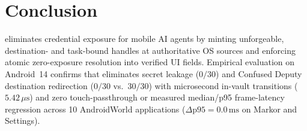 \section{Conclusion}
\label{sec:conclusion}

\SH{} eliminates credential exposure for mobile AI agents by minting unforgeable, destination- and task-bound handles at authoritative OS sources and enforcing atomic zero-exposure resolution into verified UI fields. Empirical evaluation on Android~14 confirms that \SH{} eliminates secret leakage ($0/30$) and Confused Deputy destination redirection ($0/30$ vs.\ $30/30$) with microsecond in-vault transitions ($5.42\,\mu\text{s}$) and zero touch-passthrough or measured median/p95 frame-latency regression across 10 AndroidWorld applications ($\Delta\text{p95} = 0.0\,\text{ms}$ on Markor and Settings).
